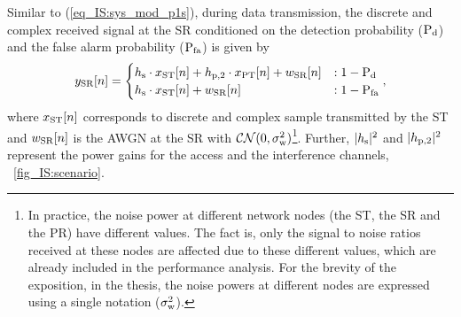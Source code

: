 Similar to (\ref{eq_IS:sys_mod_p1s}), during data transmission, the discrete and complex received signal at the SR conditioned on the detection probability ($\text{P}_{\text{d}}$) and the false alarm probability ($\text{P}_{\text{fa}}$) is given by
\begin{equation}
y_{\text{SR}}[n] = 
\begin{cases}
h_{\text{s}} \cdot x_{\text{ST}}[n] + h_{\text{p,2}} \cdot x_{\text{PT}}[n] +  w_{\text{SR}}[n] & : 1 - \text{P}_{\text{d}} \\
h_{\text{s}} \cdot x_{\text{ST}}[n] + w_{\text{SR}}[n] & : 1 - \text{P}_{\text{fa}}
\end{cases},
\label{eq_IS:sys_mod_ss}
\end{equation}
where $x_{\text{ST}}[n]$ corresponds to discrete and complex sample transmitted by the ST and $w_{\text{SR}}[n]$ is the AWGN at the SR with $\mathcal{CN}(0, \sigma^2_{\text{w}})$\footnote{In practice, the noise power at different network nodes (the ST, the SR and the PR) have different values. The fact is, only the signal to noise ratios  received at these nodes are affected due to these different values, which are already included in the performance analysis. For the brevity of the exposition, in the thesis, the noise powers at different nodes are expressed using a single notation ($\sigma^2_{\text{w}}$).}. Further, $|h_{\text{s}}|^2$ and $|h_{\text{p,2}}|^2$ represent the power gains for the access and the interference channels,  \figurename~\ref{fig_IS:scenario}. 


